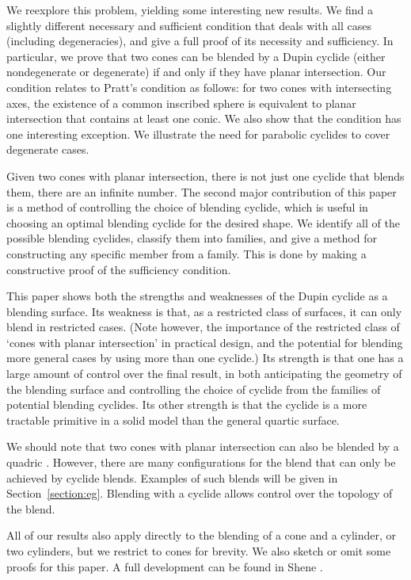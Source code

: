 We reexplore this problem, yielding some interesting new results.
We find a slightly different necessary and sufficient condition 
that deals with all cases (including degeneracies), 
and give a full proof of its necessity and sufficiency.
In particular, we prove that two cones can be blended by a Dupin cyclide
(either nondegenerate or degenerate)
if and only if they have planar intersection.
Our condition relates to Pratt's condition as follows:
for two cones with intersecting axes,
the existence of a common inscribed sphere
is equivalent to planar intersection that contains at least one conic.
We also show that the condition has one interesting exception.
We illustrate the need for parabolic cyclides to cover degenerate cases.

Given two cones with planar intersection, there is not just one cyclide
that blends them, there are an infinite number.
The second major contribution of this paper is a method of controlling
the choice of blending cyclide,
which is useful in choosing an optimal blending cyclide for the desired shape.
We identify all of the possible blending cyclides, classify them 
into families,
and give a method for constructing any specific member from a family.
This is done by making a constructive proof of the sufficiency condition.

This paper shows both the strengths and weaknesses of the Dupin cyclide as
a blending surface.
Its weakness is that, as a restricted class of surfaces, it can only blend
in restricted cases.
(Note however, the importance of the restricted class of `cones with planar
intersection' in practical design, and the potential for blending more general
cases by using more than one cyclide.)
Its strength is that one has a large amount of control over the final result,
in both anticipating the geometry of the blending surface and 
controlling the choice of cyclide from the families of potential blending
cyclides.
Its other strength is that the cyclide is a more tractable primitive in
a solid model than the general quartic surface.

We should note that two cones with planar intersection can also be blended by 
a quadric \cite{warren:1987}.
However, there are many configurations for the blend that can only be
achieved by cyclide blends.
Examples of such blends will be given in Section~\ref{section:eg}.
Blending with a cyclide allows control over the topology of the blend.

All of our results also apply directly 
to the blending of a cone and a cylinder, or two
cylinders, but we restrict to cones for brevity.
We also sketch or omit some proofs for this paper.
A full development can be found in Shene \cite{shenethesis}.

